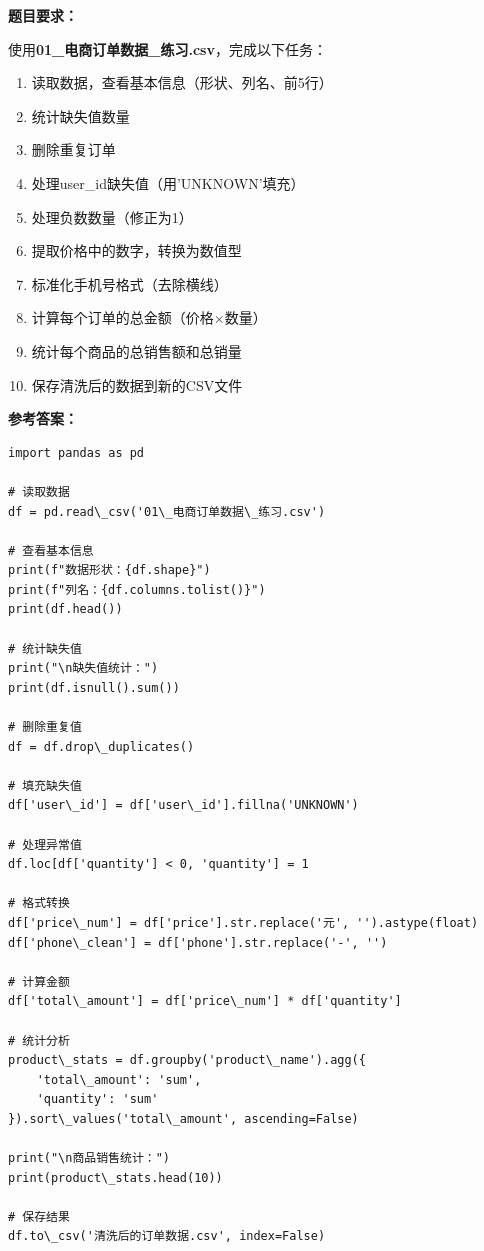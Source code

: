 \documentclass[12pt,a4paper]{article}
\begin{document}
\begin{practicebox}[竞赛模拟题1]
\textbf{题目要求：}

使用\textbf{01\_电商订单数据\_练习.csv}，完成以下任务：

\begin{enumerate}
    \item 读取数据，查看基本信息（形状、列名、前5行）
    \item 统计缺失值数量
    \item 删除重复订单
    \item 处理user\_id缺失值（用'UNKNOWN'填充）
    \item 处理负数数量（修正为1）
    \item 提取价格中的数字，转换为数值型
    \item 标准化手机号格式（去除横线）
    \item 计算每个订单的总金额（价格×数量）
    \item 统计每个商品的总销售额和总销量
    \item 保存清洗后的数据到新的CSV文件
\end{enumerate}

\textbf{参考答案：}
\begin{lstlisting}
import pandas as pd

# 读取数据
df = pd.read\_csv('01\_电商订单数据\_练习.csv')

# 查看基本信息
print(f"数据形状：{df.shape}")
print(f"列名：{df.columns.tolist()}")
print(df.head())

# 统计缺失值
print("\n缺失值统计：")
print(df.isnull().sum())

# 删除重复值
df = df.drop\_duplicates()

# 填充缺失值
df['user\_id'] = df['user\_id'].fillna('UNKNOWN')

# 处理异常值
df.loc[df['quantity'] < 0, 'quantity'] = 1

# 格式转换
df['price\_num'] = df['price'].str.replace('元', '').astype(float)
df['phone\_clean'] = df['phone'].str.replace('-', '')

# 计算金额
df['total\_amount'] = df['price\_num'] * df['quantity']

# 统计分析
product\_stats = df.groupby('product\_name').agg({
    'total\_amount': 'sum',
    'quantity': 'sum'
}).sort\_values('total\_amount', ascending=False)

print("\n商品销售统计：")
print(product\_stats.head(10))

# 保存结果
df.to\_csv('清洗后的订单数据.csv', index=False)
\end{lstlisting}
\end{practicebox}
\end{document}
